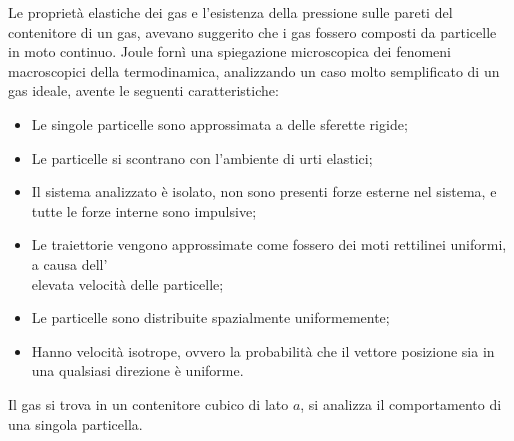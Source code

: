 \documentclass{article}
\numberwithin{equation}{subsection}
\begin{document}
Le proprietà elastiche dei gas e l'esistenza della pressione sulle pareti del contenitore di un gas, avevano suggerito che i gas fossero composti da particelle in moto 
continuo. Joule fornì una spiegazione microscopica 
dei fenomeni macroscopici della termodinamica, analizzando 
un caso molto semplificato di un gas ideale, avente le seguenti 
caratteristiche:
\begin{itemize}
    \item Le singole particelle sono approssimata a delle sferette rigide;
    \item Le particelle si scontrano con l'ambiente di urti elastici;
    \item Il sistema analizzato è isolato, non sono presenti forze 
    esterne nel sistema, e tutte le forze interne sono impulsive;
    \item Le traiettorie vengono approssimate come fossero dei 
    moti rettilinei uniformi, a causa dell'\\elevata velocità 
    delle particelle;
    \item Le particelle sono distribuite spazialmente uniformemente;
    \item Hanno velocità isotrope, ovvero la probabilità che 
    il vettore posizione sia in una qualsiasi direzione è uniforme. 
\end{itemize}
Il gas si trova in un contenitore cubico di lato $a$, 
si analizza il comportamento di una singola particella.
\end{document}
